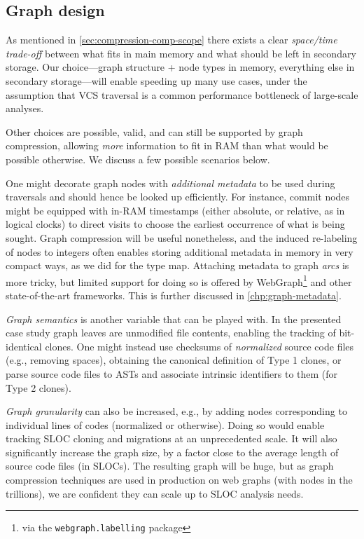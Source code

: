 \subsection{Graph design}

As mentioned in \cref{sec:compression-comp-scope} there exists a clear
\emph{space/time trade-off} between what fits in main memory and what should be
left in secondary storage. Our choice---graph structure + node types in memory,
everything else in secondary storage---will enable speeding up many use cases,
under the assumption that VCS traversal is a common performance bottleneck of
large-scale analyses.

Other choices are possible, valid, and can still be supported by graph
compression, allowing \emph{more} information to fit in RAM than what would be
possible otherwise. We discuss a few possible scenarios below.

One might decorate graph nodes with \emph{additional metadata} to be used
during traversals and should hence be looked up efficiently. For instance,
commit nodes might be equipped with in-RAM timestamps (either absolute, or
relative, as in logical clocks) to direct visits to choose the earliest
occurrence of what is being sought.
Graph compression will be useful nonetheless, and the induced re-labeling of
nodes to integers often enables storing additional metadata in memory in very
compact ways, as we did for the type map.  Attaching metadata to graph
\emph{arcs} is more tricky, but limited support for doing so is offered by
WebGraph\footnote{via the \texttt{webgraph.labelling} package} and other
state-of-the-art frameworks. This is further discussed in
\cref{chp:graph-metadata}.

\emph{Graph semantics} is another variable that can be played with. In the
presented case study graph leaves are unmodified file contents, enabling the
tracking of bit-identical clones. One might instead use checksums of
\emph{normalized} source code files (e.g., removing spaces), obtaining the
canonical definition of Type 1 clones, or parse source code files to ASTs and
associate intrinsic identifiers to them (for Type 2 clones).

\emph{Graph granularity} can also be increased, e.g., by adding nodes
corresponding to individual lines of codes (normalized or otherwise). Doing so
would enable tracking SLOC cloning and migrations at an unprecedented scale. It
will also significantly increase the graph size, by a factor close to the
average length of source code files (in SLOCs). The resulting graph will be
huge, but as graph compression techniques are used in production on web graphs
(with nodes in the trillions), we are confident they can scale up to SLOC
analysis needs.


